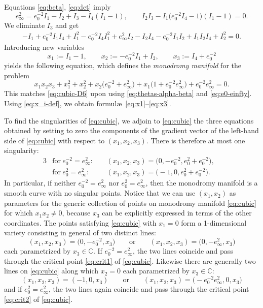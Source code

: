 Equations \eqref{eq:beta}, \eqref{eq:det} imply
\begin{equation*}
 e_\infty^2 =e_0^{-2} I_1-I_2+I_3-I_4(I_1-1),\qquad I_2I_3-I_1\big(e_0^{-2} I_4-1\big)(I_1-1)=0.
\end{equation*}
We eliminate $I_3$ and get
\begin{gather*}
 -I_1+e_0^{-2} I_1 I_4+I_1^2-e_0^{-2} I_4 I_1^2+e_\infty^2 I_2- I_2I_4 -e_0^{-2}I_1I_2+I_1I_2I_4+I_2^2=0.
\end{gather*}
Introducing new variables
\begin{equation}
x_1:=I_1-1,\qquad x_2:=-e_0^{-2} I_1+I_2,\qquad x_3:=I_4+e_0^{-2}
\label{eq:x_i-def}
\end{equation}
yields the following equation, which defines the \emph{monodromy manifold} for the problem
\begin{equation}
 \label{eq:cubic} x_1x_2x_3+x_1^2+x_2^2+x_2\big(e_0^{-2}+e_\infty^2\big)+x_1\big(1+e^{-2}_0 e^{2}_\infty\big)+e^{-2}_0e^{2}_\infty=0.
\end{equation}
This matches \eqref{eq:cubic-D6} upon using \eqref{eq:thetas-alpha-beta} and \eqref{eq:e0-einfty}. Using \eqref{eq:x_i-def}, we obtain formul\ae\ \eqref{eq:x1}--\eqref{eq:x3}.

To find the singularities of \eqref{eq:cubic}, we adjoin to \eqref{eq:cubic} the three equations obtained by setting to zero the components of the gradient vector of the left-hand side of \eqref{eq:cubic} with respect to $(x_1,x_2,x_3)$. There is therefore at most one singularity:
\begin{alignat}{3}\label{eq:crit1}
 &\text{for}\ e^{-2}_0=e^2_\infty\colon\ &&(x_1,x_2,x_3)=\big(0,-e^{-2}_0,e^{2}_0+e_0^{-2}\big),&\\
 &\text{for}\ e^{2}_0=e_\infty^{2}\colon\ &&(x_1,x_2,x_3)=\bigl(-1,0,e^{2}_0+e_0^{-2}\bigr).&\label{eq:crit2}
\end{alignat}
In particular, if neither $e^{-2}_0=e^2_\infty$ nor $e^{2}_0=e^2_\infty$, then the monodromy manifold is a smooth curve with no singular points.
Notice that we can use $(x_1,x_2)$ as parameters for the generic collection of points on monodromy manifold \eqref{eq:cubic} for which $x_1x_2\neq 0$, because $x_3$ can be explicitly expressed in terms of the other coordinates. The points satisfying \eqref{eq:cubic} with $x_1=0$ form a 1-dimensional variety consisting in general of two distinct lines:
\begin{equation*}
 (x_1,x_2,x_3)=\big(0,-e^{-2}_0,x_3\big)\qquad\text{or}\qquad (x_1,x_2,x_3)=\big(0,-e^2_\infty,x_3\big)
\end{equation*}
each parametrized by $x_3\in\mathbb{C}$. If $e_0^{-2}=e_\infty^2$, the two lines coincide and pass through the critical point \eqref{eq:crit1} of \eqref{eq:cubic}. Likewise there are generally two lines on \eqref{eq:cubic} along which $x_2=0$ each parametrized by $x_3\in\mathbb{C}$:
\begin{equation*}
 (x_1,x_2,x_3)=(-1,0,x_3)\qquad\text{or}\qquad (x_1,x_2,x_3)=\bigl(-e^{-2}_0e^2_\infty,0,x_3\bigr)
\end{equation*}
and if $e^{2}_0=e_\infty^{2}$, the two lines again coincide and pass through the critical point \eqref{eq:crit2} of \eqref{eq:cubic}.

